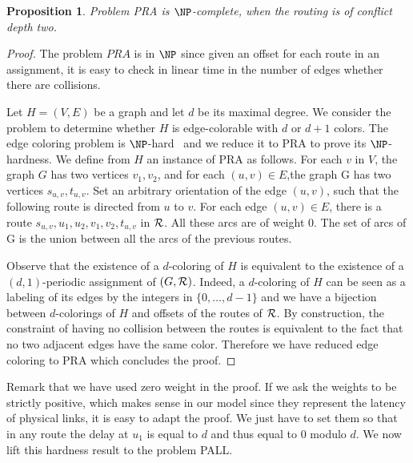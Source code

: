 \documentclass[a4paper,10pt]{article}
\newtheorem{proposition}{Proposition}
\begin{document}
 \begin{proposition}
Problem PRA is $\NP$-complete, when the routing is of conflict depth two.
\end{proposition}
 \begin{proof}
 The problem $PRA$ is in $\NP$ since given an offset for each route in an assignment, it is easy to check in linear time in the number of edges whether there are collisions.
 
  Let $H=(V,E)$ be a graph and let $d$ be its maximal degree. We consider the problem to determine whether $H$ is edge-colorable
  with $d$ or $d+1$ colors. The edge coloring problem is $\NP$-hard~\cite{holyer1981np} and we reduce it to PRA to prove its $\NP$-hardness. We define from $H$ an instance of PRA as follows. 
  For each $v$ in $V$, the graph $G$ has two vertices $v_1, v_2$, and for each $(u,v) \in E$,the graph G has two vertices $s_{u,v}, t_{u,v}$. Set an arbitrary orientation of the edge $(u,v)$, such that the following route is directed from $u$ to $v$.
  For each edge $(u,v) \in E$, there is a route $s_{u,v},u_1,u_2,v_1,v_2,t_{u,v}$ in ${\cal R}$.  
  All these arcs are of weight $0$. The set of arcs of G is the union between all the arcs of the previous routes.
   
    
  Observe that the existence of a $d$-coloring of $H$ is equivalent to the existence of a $(d,1)$-periodic assignment
  of $(G,{\cal R})$. Indeed, a $d$-coloring of $H$ can be seen as a labeling of its edges by the integers
  in $\{0,\dots,d-1\}$ and we have a bijection between $d$-colorings of $H$ and offsets of the routes of ${\cal R}$.
  By construction, the constraint of having no collision between the routes is equivalent to the fact that no two adjacent edges have the same color. Therefore we have reduced edge coloring to PRA which concludes the proof. 
 \end{proof}
 
 Remark that we have used zero weight in the proof. If we ask the weights to be strictly positive, which makes sense in our model since
they represent the latency of physical links, it is easy to adapt the proof. We just have to set them so that in any route the delay at $u_1$ is equal to $d$ and thus equal to $0$ modulo $d$. We now lift this hardness result to the problem PALL.
\end{document}
